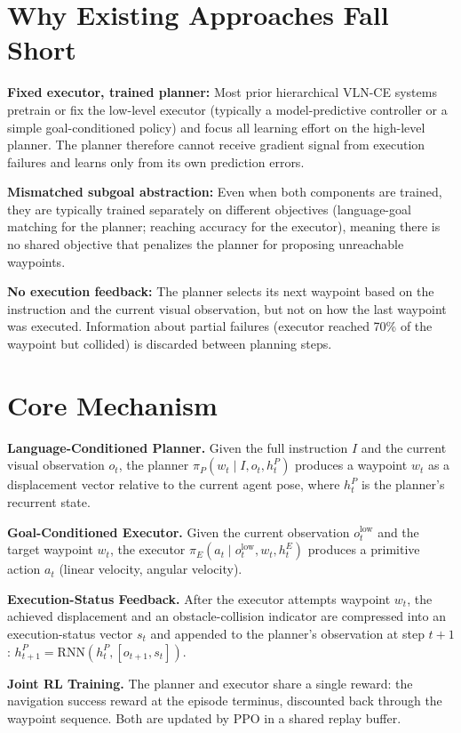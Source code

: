\documentclass[10pt,twocolumn]{article}
\begin{document}
\section{Why Existing Approaches Fall Short}

\textbf{Fixed executor, trained planner:}
Most prior hierarchical VLN-CE systems pretrain or fix the low-level
executor (typically a model-predictive controller or a simple
goal-conditioned policy) and focus all learning effort on the
high-level planner. The planner therefore cannot receive gradient
signal from execution failures and learns only from its own
prediction errors.

\textbf{Mismatched subgoal abstraction:}
Even when both components are trained, they are typically trained
separately on different objectives (language-goal matching for the
planner; reaching accuracy for the executor), meaning there is no
shared objective that penalizes the planner for proposing unreachable
waypoints.

\textbf{No execution feedback:}
The planner selects its next waypoint based on the instruction and
the current visual observation, but not on how the last waypoint
was executed. Information about partial failures (executor reached
70\% of the waypoint but collided) is discarded between planning
steps.

\section{Core Mechanism}

\textbf{Language-Conditioned Planner.} Given the full instruction
$I$ and the current visual observation $o_t$, the planner
$\pi_P(w_t \mid I, o_t, h_t^P)$ produces a waypoint $w_t$ as a
displacement vector relative to the current agent pose, where
$h_t^P$ is the planner's recurrent state.

\textbf{Goal-Conditioned Executor.} Given the current observation
$o_t^{\text{low}}$ and the target waypoint $w_t$, the executor
$\pi_E(a_t \mid o_t^{\text{low}}, w_t, h_t^E)$ produces a
primitive action $a_t$ (linear velocity, angular velocity).

\textbf{Execution-Status Feedback.} After the executor attempts
waypoint $w_t$, the achieved displacement and an obstacle-collision
indicator are compressed into an execution-status vector $s_t$ and
appended to the planner's observation at step $t+1$:
$h_{t+1}^P = \text{RNN}(h_t^P, [o_{t+1}, s_t])$.

\textbf{Joint RL Training.} The planner and executor share a single
reward: the navigation success reward at the episode terminus,
discounted back through the waypoint sequence. Both are updated by
PPO in a shared replay buffer.
\end{document}
